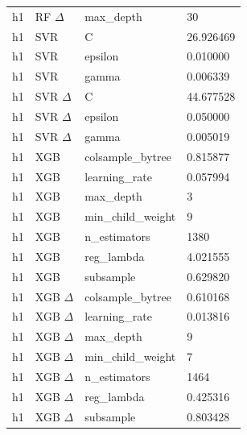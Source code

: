 \begin{longtable}{lp{.20\linewidth}p{.32\linewidth}l}
h1 & RF $\Delta$ & max\_depth & 30 \\
h1 & SVR & C & \num{26.926469} \\
h1 & SVR & epsilon & \num{0.010000} \\
h1 & SVR & gamma & \num{0.006339} \\
h1 & SVR $\Delta$ & C & \num{44.677528} \\
h1 & SVR $\Delta$ & epsilon & \num{0.050000} \\
h1 & SVR $\Delta$ & gamma & \num{0.005019} \\
h1 & XGB & colsample\_bytree & \num{0.815877} \\
h1 & XGB & learning\_rate & \num{0.057994} \\
h1 & XGB & max\_depth & 3 \\
h1 & XGB & min\_child\_weight & 9 \\
h1 & XGB & n\_estimators & 1380 \\
h1 & XGB & reg\_lambda & \num{4.021555} \\
h1 & XGB & subsample & \num{0.629820} \\
h1 & XGB $\Delta$ & colsample\_bytree & \num{0.610168} \\
h1 & XGB $\Delta$ & learning\_rate & \num{0.013816} \\
h1 & XGB $\Delta$ & max\_depth & 9 \\
h1 & XGB $\Delta$ & min\_child\_weight & 7 \\
h1 & XGB $\Delta$ & n\_estimators & 1464 \\
h1 & XGB $\Delta$ & reg\_lambda & \num{0.425316} \\
h1 & XGB $\Delta$ & subsample & \num{0.803428} \\
\end{longtable}\endgroup
